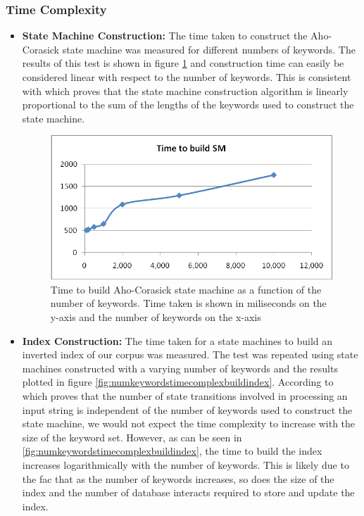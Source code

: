 \documentclass[10pt]{report}
\begin{document}
\subsubsection{Time Complexity}
\begin{itemize}
\item \textbf{State Machine Construction:}
  The time taken to construct the Aho-Corasick state machine was
  measured for different numbers of keywords. The results of this test
  is shown in figure \ref{fig:numkeywordstimecomplexbuildsm} and construction time
  can easily be considered linear with respect to the number of
  keywords. This is consistent with \cite{RefWorks:103} which proves
  that the state machine construction algorithm is linearly
  proportional to the sum of the lengths of the keywords used to
  construct the state machine.

  \begin{figure}
    \begin{center}
      \includegraphics[width=\textwidth,height=!]{numkeywordstimecomplexbuildsm}
    \end{center}
    \caption{Time to build Aho-Corasick state machine as a function of
      the number of keywords. Time taken is shown in miliseconds on the
      y-axis and the number of keywords on the x-axis}
    \label{fig:numkeywordstimecomplexbuildsm}
  \end{figure} 
  
\item \textbf{Index Construction:} 
  The time taken for a state machines to build an inverted index of our
  corpus was measured. The test was repeated using state machines
  constructed with a varying number of keywords and the results plotted
  in figure \ref{fig:numkeywordstimecomplexbuildindex}. According to
  \cite{RefWorks:103} which proves that the number of state transitions
  involved in processing an input string is independent of the number of
  keywords used to construct the state machine, we would not expect the
  time complexity to increase with the size of the keyword set. However,
  as can be seen in \ref{fig:numkeywordstimecomplexbuildindex}, the time
  to build the index increases logarithmically with the number of
  keywords. This is likely due to the fac that as the number of keywords
  increases, so does the size of the index and the number of database
  interacts required to store and update the index.


\end{itemize}
\end{document}

